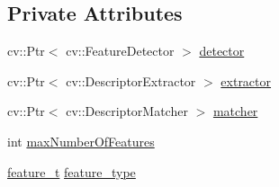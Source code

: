 \subsection*{\-Private \-Attributes}
\begin{DoxyCompactItemize}
\item 
cv\-::\-Ptr$<$ cv\-::\-Feature\-Detector $>$ \hyperlink{classLRM_1_1ImageProcessor_a576a9af86d68d4394984e630c7ec452d}{detector}
\item 
cv\-::\-Ptr$<$ cv\-::\-Descriptor\-Extractor $>$ \hyperlink{classLRM_1_1ImageProcessor_a7a52a914f184c8b01fe42d582fc17af0}{extractor}
\item 
cv\-::\-Ptr$<$ cv\-::\-Descriptor\-Matcher $>$ \hyperlink{classLRM_1_1ImageProcessor_a55350c39b33c45697fcf48ff75bef2d1}{matcher}
\item 
int \hyperlink{classLRM_1_1ImageProcessor_afcdba0a2c3377e8d89d8abb42632bf3a}{max\-Number\-Of\-Features}
\item 
\hyperlink{namespaceLRM_a8eb6956b84fb7d27bce5af771937794f}{feature\-\_\-t} \hyperlink{classLRM_1_1ImageProcessor_abdfb33d345e6e7eebff614252e27095b}{feature\-\_\-type}
\end{DoxyCompactItemize}


